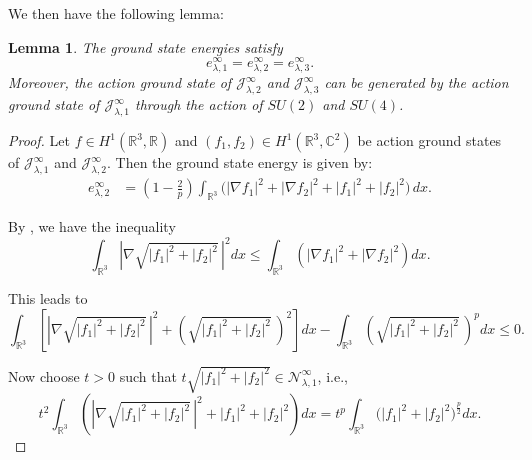 \documentclass{amsart}
\theoremstyle{plain}
\newtheorem{lemma}[theorem]{Lemma}
\theoremstyle{definition}
\theoremstyle{remark}
\numberwithin{equation}{section} \numberwithin{figure}{section}
\begin{document}
We then have the following lemma:

\begin{lemma}\label{B_5}
The ground state energies satisfy  
\[
e^\infty_{\lambda,1} = e^\infty_{\lambda,2} = e^\infty_{\lambda,3}.
\]
Moreover, the action ground state of $\mathcal{J}^\infty_{\lambda, 2}$ and  $\mathcal{J}^\infty_{\lambda, 3}$ can be generated by the action ground state of $\mathcal{J}^\infty_{\lambda, 1}$ through the action of $SU(2)$ and $SU(4)$.
\end{lemma}



\begin{proof}
Let  $f \in H^1(\mathbb{R}^3, \mathbb{R})$ and $(f_1, f_2) \in H^1(\mathbb{R}^3, \mathbb{C}^2)$ be action ground states of $\mathcal{J}^\infty_{\lambda, 1}$ and $\mathcal{J}^\infty_{\lambda, 2}$. Then the ground state energy is given by:
\begin{align*}
e^\infty_{\lambda,2} &= \left(1 - \frac{2}{p}\right) \int_{\mathbb{R}^3} \big(|\nabla f_1|^2 + |\nabla f_2|^2 + |f_1|^2 + |f_2|^2\big) \, dx.
\end{align*}

By \cite[Theorem 6.17]{MR1817225}, we have the inequality
\[
\int_{\mathbb{R}^3} \left| \nabla \sqrt{|f_1|^2 + |f_2|^2} \,\right|^2 dx \leq \int_{\mathbb{R}^3} \left( |\nabla f_1|^2 + |\nabla f_2|^2 \right) dx.
\]

This leads to
\begin{equation}\label{B_1}
\int_{\mathbb{R}^3} \left[ \left| \nabla \sqrt{|f_1|^2 + |f_2|^2} \,\right|^2 + \left( \sqrt{|f_1|^2 + |f_2|^2} \,\right)^2 \right] dx - \int_{\mathbb{R}^3} \left( \sqrt{|f_1|^2 + |f_2|^2} \,\right)^p dx \leq 0.
\end{equation}

Now choose $t > 0$ such that $t \sqrt{|f_1|^2 + |f_2|^2} \in \mathcal{N}^\infty_{\lambda,1}$, i.e.,
\[
t^2 \int_{\mathbb{R}^3} \left( \left| \nabla \sqrt{|f_1|^2 + |f_2|^2} \,\right|^2 + |f_1|^2 + |f_2|^2 \right) dx = t^p \int_{\mathbb{R}^3} \big( |f_1|^2 + |f_2|^2 \big)^{\frac{p}{2}} dx.
\]


\end{proof}
\end{document}
